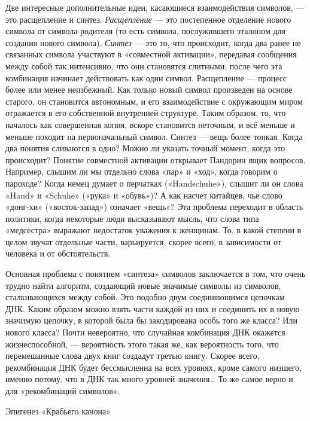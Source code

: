 \documentclass[../main.tex]{subfiles}
\begin{document}
Две интересные дополнительные идеи, касающиеся взаимодействия символов, --- это расщепление и синтез. \emph{Расщепление} --- это постепенное отделение нового символа от символа-родителя (то есть символа, послужившего эталоном для создания нового символа). \emph{Синтез} --- это то, что происходит, когда два ранее не связанных символа участвуют в «совместной активации», передавая сообщения между собой так интенсивно, что они становятся слитными; после чего эта комбинация начинает действовать как один символ. Расщепление --- процесс более или менее неизбежный. Как только новый символ произведен на основе старого, он становится автономным, и его взаимодействие с окружающим миром отражается в его собственной внутренней структуре. Таким образом, то, что началось как совершенная копия, вскоре становится неточным, и всё меньше и меньше походит на первоначальный символ. Синтез --- вещь более тонкая. Когда два понятия сливаются в одно? Можно ли указать точный момент, когда это происходит? Понятие совместной активации открывает Пандорин ящик вопросов. Например, слышим ли мы отдельно слова «пар» и «ход», когда говорим о пароходе? Когда немец думает о перчатках («Handschuhe»), слышит ли он слова «Hand» и «Schuhe» («рука» и «обувь»)? А как насчет китайцев, чье слово «донг-хи» («восток-запад») означает «вещь»? Эта проблема переходит в область политики, когда некоторые люди высказывают мысль, что слова типа «медсестра» выражают недостаток уважения к женщинам. То, в какой степени в целом звучат отдельные части, варьируется, скорее всего, в зависимости от человека и от обстоятельств.

Основная проблема с понятием «синтеза» символов заключается в том, что очень трудно найти алгоритм, создающий новые значимые символы из символов, сталкивающихся между собой. Это подобно двум соединяющимся цепочкам ДНК\@. Каким образом можно взять части каждой из них и соединить их в новую значимую цепочку, в которой была бы закодирована особь того же класса? Или нового класса? Почти невероятно, что случайная комбинация ДНК окажется жизнеспособной, --- вероятность этого такая же, как вероятность того, что перемешанные слова двух книг создадут третью книгу. Скорее всего, рекомбинация ДНК будет бессмысленна на всех уровнях, кроме самого низшего, именно потому, что в ДНК так много уровней значения\ldots{} То же самое верно и для «рекомбинаций символов».

Эпигенез «Крабьего канона»
\end{document}
